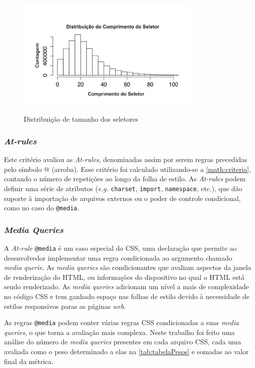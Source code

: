 \begin{figure}[!htb]
	\centering
	\caption{Distribuição de tamanho dos seletores}
	\includegraphics[width=0.8\textwidth]{./04-figuras/dist_selectorL}
	\label{fig:distributionLength}
\end{figure}

\subsubsection{\textit{At-rules}}
Este critério avaliou as \textit{At-rules}, denominadas assim por serem regras precedidas pelo símbolo @ (arroba). Esse critério foi calculado utilizando-se a \autoref{math:criteria}, contando o número de repetições ao longo da folha de estilo. As \textit{At-rules} podem definir uma série de atributos (\textit{e.g.} \texttt{charset}, \texttt{import}, \texttt{namespace}, etc.), que dão suporte à importação de arquivos externos ou o poder de controle condicional, como no caso do \texttt{@media}.

\subsubsection{\textit{Media Queries}}
A \textit{At-rule} \texttt{@media} é um caso especial do CSS, uma declaração que permite ao desenvolvedor implementar uma regra condicionada ao argumento chamado \textit{media querie}. As \textit{media queries} são condicionantes que avaliam aspectos da janela de renderização do HTML, ou informações do dispositivo no qual o HTML está sendo renderizado. As \textit{media queries} adicionam um nível a mais de complexidade no código CSS e tem ganhado espaço nas folhas de estilo devido à necessidade de estilos responsivos paras as páginas \textit{web}. 

As regras \texttt{@media} podem conter várias regras CSS condicionadas a suas \textit{media queries}, o que torna a avaliação mais complexa. Neste trabalho foi feito uma análise do número de \textit{media queries} presentes em cada arquivo CSS, cada uma avaliada como o peso determinado a elas na \autoref{tab:tabelaPesos} e somadas ao valor final da métrica.

